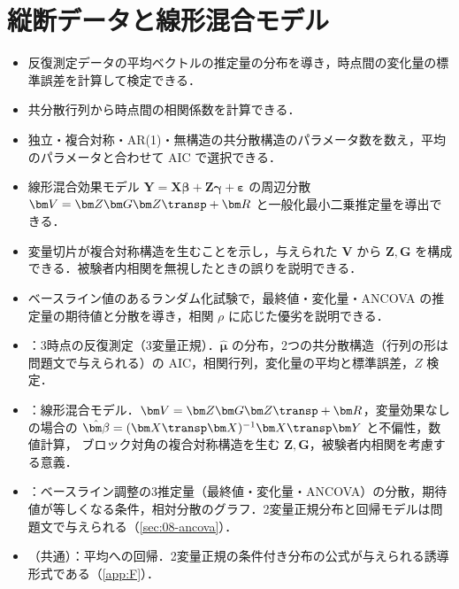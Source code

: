\chapter{縦断データと線形混合モデル}\label{ch:08}

\begin{goalbox}
\begin{itemize}
\item 反復測定データの平均ベクトルの推定量の分布を導き，時点間の変化量の標準誤差を計算して検定できる．
\item 共分散行列から時点間の相関係数を計算できる．
\item 独立・複合対称・AR(1)・無構造の共分散構造のパラメータ数を数え，平均のパラメータと合わせて AIC で選択できる．
\item 線形混合効果モデル $\bm Y=\bm X\bm\beta+\bm Z\bm\gamma+\bm\varepsilon$ の周辺分散 $\bm V=\bm Z\bm G\bm Z\transp+\bm R$ と一般化最小二乗推定量を導出できる．
\item 変量切片が複合対称構造を生むことを示し，与えられた $\bm V$ から $\bm Z,\bm G$ を構成できる．被験者内相関を無視したときの誤りを説明できる．
\item ベースライン値のあるランダム化試験で，最終値・変化量・ANCOVA の推定量の期待値と分散を導き，相関 $\rho$ に応じた優劣を説明できる．
\end{itemize}
\end{goalbox}

\begin{exambox}
\begin{itemize}
\item {}：3時点の反復測定（3変量正規）．$\hat{\bm\mu}$ の分布，2つの共分散構造（行列の形は問題文で与えられる）の AIC，相関行列，変化量の平均と標準誤差，$Z$ 検定．
\item {}：線形混合モデル．$\bm V=\bm Z\bm G\bm Z\transp+\bm R$，変量効果なしの場合の $\hat{\bm\beta}=(\bm X\transp\bm X)^{-1}\bm X\transp\bm Y$ と不偏性，数値計算，
      ブロック対角の複合対称構造を生む $\bm Z,\bm G$，被験者内相関を考慮する意義．
\item {}：ベースライン調整の3推定量（最終値・変化量・ANCOVA）の分散，期待値が等しくなる条件，相対分散のグラフ．2変量正規分布と回帰モデルは問題文で与えられる（\cref{sec:08-ancova}）．
\item {}（共通）：平均への回帰．2変量正規の条件付き分布の公式が与えられる誘導形式である（\cref{app:F}）．
\end{itemize}
\end{exambox}

